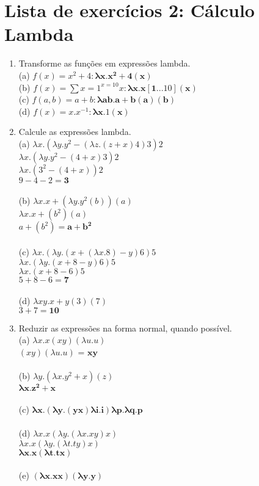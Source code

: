 \documentclass{article}
\begin{document}
\section*{Lista de exercícios 2: Cálculo Lambda}
\begin{enumerate}
    \item Transforme as funções em expressões lambda. \\
    (a) $f(x)=x^{2}+4 : \mathbf{\lambda x.x^{2}+4 (x)}$ \\
    (b) $f(x)=\sum{x=1}^{x=10}x : \mathbf{\lambda x.x[1...10] (x)}$ \\
    (c) $f(a, b)=a+b : \mathbf{\lambda ab.a+b (a)(b)}$ \\
    (d) $f(x) = x.x^{-1} : \mathbf{\lambda x.1 (x)}$ \\
    
    \item Calcule as expressões lambda. \\
    (a) $\lambda x.(\lambda y.y^{2} - (\lambda z.(z+x)4)3)2$ \\
        $\lambda x.(\lambda y.y^{2} - (4+x)3)2$ \\
        $\lambda x.(3^{2} - (4+x))2$ \\
        $9 - 4 - 2 = \mathbf{3}$ \\ \\
    (b) $\lambda x.x + (\lambda y.y^{2}(b))(a)$ \\
        $\lambda x.x + (b^{2})(a)$ \\
        $a + (b^{2}) = \mathbf{a+b^{2}}$ \\ \\
    (c) $\lambda x.(\lambda y.(x+(\lambda x.8)-y)6)5$ \\
        $\lambda x.(\lambda y.(x+8-y)6)5$ \\
        $\lambda x.(x+8-6)5$ \\
        $5+8-6 = \mathbf{7}$ \\ \\
    (d) $\lambda xy.x+y (3)(7)$ \\
        $3+7 = \mathbf{10}$
    
    \item Reduzir as expressões na forma normal, quando possível. \\
    (a) $\lambda x.x(xy)(\lambda u.u)$ \\
        $(xy)(\lambda u.u)$ = $\mathbf{xy}$ \\ \\
    (b) $\lambda y.(\lambda x.y^{2}+x)(z)$ \\
        $\mathbf{\lambda x.z^{2}+x}$ \\ \\ 
    (c) $\mathbf{\lambda x.(\lambda y.(yx)\lambda i.i)\lambda p.\lambda q.p}$ \\ \\
    (d) $\lambda x.x(\lambda y.(\lambda x.xy)x)$ \\
        $\lambda x.x(\lambda y.(\lambda t.ty)x)$ \\
        $\mathbf{\lambda x.x(\lambda t.tx)}$ \\ \\
    (e) $\mathbf{(\lambda x.xx)(\lambda y.y)}$
\end{enumerate}
\end{document}

